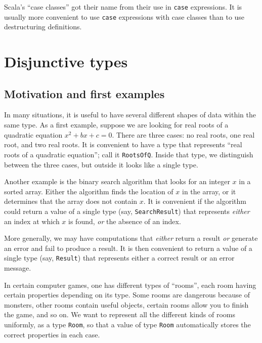 Scala\textsf{'}s \textsf{``}case classes\textsf{''} got their name from their use in \lstinline!case!
expressions. It is usually more convenient to use \lstinline!case!
expressions with case classes than to use destructuring definitions.

\section{Disjunctive types}

\subsection{Motivation and first examples\label{subsec:Disjunctive-Motivation-and-first-examples}}

In many situations, it is useful to have several different shapes
of data within the same type. As a first example, suppose we are looking
for real roots of a quadratic equation $x^{2}+bx+c=0$. There are
three cases: no real roots, one real root, and two real roots. It
is convenient to have a type that represents \textsf{``}real roots of a quadratic
equation\textsf{''}; call it \lstinline!RootsOfQ!. Inside that type, we distinguish
between the three cases, but outside it looks like a single type.

Another example is the binary search algorithm that looks for an integer
$x$ in a sorted array. Either the algorithm finds the location of
$x$ in the array, or it determines that the array does not contain
$x$. It is convenient if the algorithm could return a value of a
single type (say, \lstinline!SearchResult!) that represents \emph{either}
an index at which $x$ is found, \emph{or} the absence of an index.

More generally, we may have computations that \emph{either} return
a result \emph{or} generate an error and fail to produce a result.
It is then convenient to return a value of a single type (say, \lstinline!Result!)
that represents either a correct result or an error message. 

In certain computer games, one has different types of \textsf{``}rooms\textsf{''},
each room having certain properties depending on its type. Some rooms
are dangerous because of monsters, other rooms contain useful objects,
certain rooms allow you to finish the game, and so on. We want to
represent all the different kinds of rooms uniformly, as a type \lstinline!Room!,
so that a value of type \lstinline!Room! automatically stores the
correct properties in each case.

